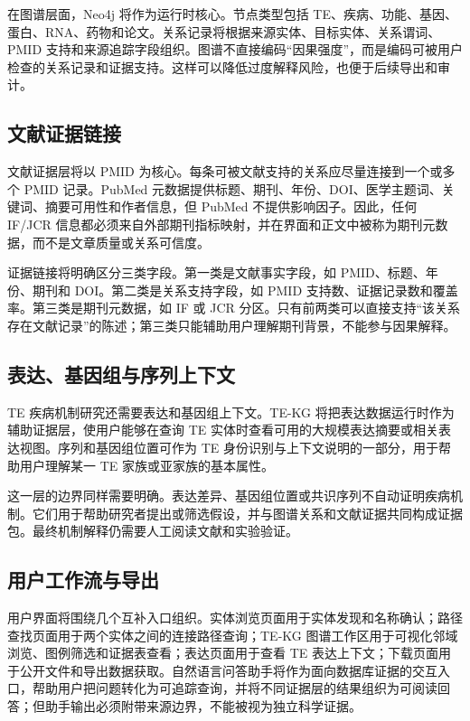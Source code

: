 \documentclass[12pt,a4paper,UTF8]{ctexart}
\begin{document}
在图谱层面，Neo4j 将作为运行时核心。节点类型包括 TE、疾病、功能、基因、蛋白、RNA、药物和论文。关系记录将根据来源实体、目标实体、关系谓词、PMID 支持和来源追踪字段组织。图谱不直接编码“因果强度”，而是编码可被用户检查的关系记录和证据支持。这样可以降低过度解释风险，也便于后续导出和审计。

\subsection{文献证据链接}

文献证据层将以 PMID 为核心。每条可被文献支持的关系应尽量连接到一个或多个 PMID 记录。PubMed 元数据提供标题、期刊、年份、DOI、医学主题词、关键词、摘要可用性和作者信息，但 PubMed 不提供影响因子\cite{pubmed_ncbi}。因此，任何 IF/JCR 信息都必须来自外部期刊指标映射，并在界面和正文中被称为期刊元数据，而不是文章质量或关系可信度。

证据链接将明确区分三类字段。第一类是文献事实字段，如 PMID、标题、年份、期刊和 DOI。第二类是关系支持字段，如 PMID 支持数、证据记录数和覆盖率。第三类是期刊元数据，如 IF 或 JCR 分区。只有前两类可以直接支持“该关系存在文献记录”的陈述；第三类只能辅助用户理解期刊背景，不能参与因果解释。

\subsection{表达、基因组与序列上下文}

TE 疾病机制研究还需要表达和基因组上下文。TE-KG 将把表达数据运行时作为辅助证据层，使用户能够在查询 TE 实体时查看可用的大规模表达摘要或相关表达视图。序列和基因组位置可作为 TE 身份识别与上下文说明的一部分，用于帮助用户理解某一 TE 家族或亚家族的基本属性。

这一层的边界同样需要明确。表达差异、基因组位置或共识序列不自动证明疾病机制。它们用于帮助研究者提出或筛选假设，并与图谱关系和文献证据共同构成证据包。最终机制解释仍需要人工阅读文献和实验验证。

\subsection{用户工作流与导出}

用户界面将围绕几个互补入口组织。实体浏览页面用于实体发现和名称确认；路径查找页面用于两个实体之间的连接路径查询；TE-KG 图谱工作区用于可视化邻域浏览、图例筛选和证据表查看；表达页面用于查看 TE 表达上下文；下载页面用于公开文件和导出数据获取。自然语言问答助手将作为面向数据库证据的交互入口，帮助用户把问题转化为可追踪查询，并将不同证据层的结果组织为可阅读回答；但助手输出必须附带来源边界，不能被视为独立科学证据。
\end{document}
